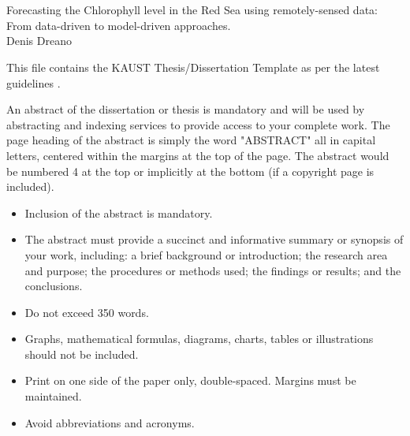 

\chapter*{}

\doublespacing
{}

\begin{center}
\Large {Forecasting the Chlorophyll level in the Red Sea using remotely-sensed data: From data-driven to model-driven approaches.\\
Denis Dreano}
\end{center}

This file contains the KAUST Thesis/Dissertation Template as per the latest guidelines \cite{guidelines}.

An abstract of the dissertation or thesis is mandatory and will be used by abstracting and indexing services to provide access to your complete work. The page heading of the abstract is simply the word "ABSTRACT" all in capital letters, centered within the margins at the top of the page. The abstract would be numbered 4 at the top or implicitly at the bottom (if a copyright page is included).

\begin{itemize}
\item Inclusion of the abstract is mandatory.
\item	The abstract must provide a succinct and informative summary or synopsis of your work, including: a brief background or introduction; the research area and purpose; the procedures or methods used; the findings or results; and the conclusions.
\item	Do not exceed 350 words.
\item	Graphs, mathematical formulas, diagrams, charts, tables or illustrations should not be included. 
\item	Print on one side of the paper only, double-spaced.  Margins must be maintained. 
\item	Avoid abbreviations and acronyms.

\end{itemize}

